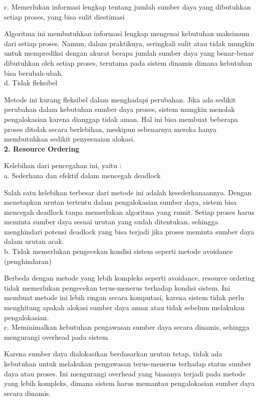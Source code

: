 \documentclass[12pt]{article}
\begin{document}
	c. Memerlukan informasi lengkap tentang jumlah sumber daya yang dibutuhkan setiap proses, yang bisa sulit diestimasi

    Algoritma ini membutuhkan informasi lengkap mengenai kebutuhan maksimum dari setiap proses. Namun, dalam praktiknya, seringkali sulit atau tidak mungkin untuk memprediksi dengan akurat berapa jumlah sumber daya yang benar-benar dibutuhkan oleh setiap proses, terutama pada sistem dinamis dimana kebutuhan bisa berubah-ubah.\\

	d. Tidak fleksibel

    Metode ini kurang fleksibel dalam menghadapi perubahan. Jika ada sedikit perubahan dalam kebutuhan sumber daya proses, sistem mungkin menolak pengalokasian karena dianggap tidak aman. Hal ini bisa membuat beberapa proses ditolak secara berlebihan, meskipun sebenarnya mereka hanya membutuhkan sedikit penyesuaian alokasi.\\

\textbf{2. Resource Ordering\\}

    Kelebihan dari pencegahan ini, yaitu :\\

    a. Sederhana dan efektif dalam mencegah deadlock
    
    Salah satu kelebihan terbesar dari metode ini adalah kesederhanaannya. Dengan menetapkan urutan tertentu dalam pengalokasian sumber daya, sistem bisa mencegah deadlock tanpa memerlukan algoritma yang rumit. Setiap proses harus meminta sumber daya sesuai urutan yang sudah ditentukan, sehingga menghindari potensi deadlock yang bisa terjadi jika proses meminta sumber daya dalam urutan acak.\\

    b. Tidak memerlukan pengecekan kondisi sistem seperti metode avoidance (penghindaran)
    
    Berbeda dengan metode yang lebih kompleks seperti avoidance, resource ordering tidak memerlukan pengecekan terus-menerus terhadap kondisi sistem. Ini membuat metode ini lebih ringan secara komputasi, karena sistem tidak perlu menghitung apakah alokasi sumber daya aman atau tidak sebelum melakukan pengalokasian.\\

    c. Meminimalkan kebutuhan pengawasan sumber daya secara dinamis, sehingga mengurangi overhead pada sistem
    
    Karena sumber daya dialokasikan berdasarkan urutan tetap, tidak ada kebutuhan untuk melakukan pengawasan terus-menerus terhadap status sumber daya atau proses. Ini mengurangi overhead yang biasanya terjadi pada metode yang lebih kompleks, dimana sistem harus memantau pengalokasian sumber daya secara dinamis.\\
\end{document}
